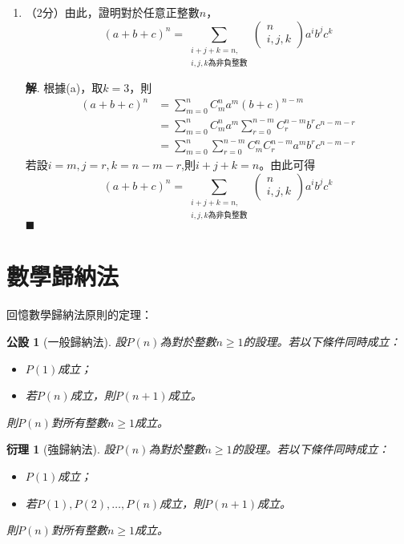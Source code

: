 \documentclass[12pt]{article}
\newtheorem*{corollary}{衍理}
\newtheorem*{axiom}{公設}
\newenvironment*{sol}{\par \textbf{解}.}{\hfill$\blacksquare$}
\begin{document}
\begin{enumerate}
\begin{enumerate}
\begin{sol}
                $\therefore$根據數學歸納法原理，$P(k)$對所有整數$k\geq 2$成立。
            \end{sol}
            \item （2分）由此，證明對於任意正整數$n$，$$(a+b+c)^n=\sum_{\substack{i+j+k=n, \\ i,j,k\textrm{為非負整數}}} \begin{pmatrix}
                n\\i,j,k
            \end{pmatrix}a^ib^jc^k$$\begin{sol}
                根據(a)，取$k=3$，則\begin{align*}
                    (a+b+c)^n&=\sum_{m=0}^{n}C_m^n a^m(b+c)^{n-m}\\
                    &=\sum_{m=0}^{n}C_m^n a^m\sum_{r=0}^{n-m}C_r^{n-m} b^r c^{n-m-r}\\
                    &=\sum_{m=0}^{n}\sum_{r=0}^{n-m}C_m^n C_r^{n-m} a^m b^r c^{n-m-r}
                \end{align*}
                若設$i=m,j=r,k=n-m-r$,則$i+j+k=n$。由此可得$$(a+b+c)^n=\sum_{\substack{i+j+k=n, \\ i,j,k\textrm{為非負整數}}} \begin{pmatrix}
                    n\\i,j,k
                \end{pmatrix}a^ib^jc^k$$
            \end{sol}
        \end{enumerate}
    \end{enumerate}

    \section*{數學歸納法}

    回憶數學歸納法原則的定理：

    \begin{axiom}[一般歸納法]
        設$P(n)$為對於整數$n\geq 1$的設理。若以下條件同時成立：\begin{itemize}
            \item $P(1)$成立；
            \item 若$P(n)$成立，則$P(n+1)$成立。
        \end{itemize}
        則$P(n)$對所有整數$n\geq 1$成立。
    \end{axiom}

    \begin{corollary}[強歸納法]
        設$P(n)$為對於整數$n\geq 1$的設理。若以下條件同時成立：\begin{itemize}
            \item $P(1)$成立；
            \item 若$P(1),P(2),\dots,P(n)$成立，則$P(n+1)$成立。
        \end{itemize}
        則$P(n)$對所有整數$n\geq 1$成立。
    \end{corollary}
\end{document}
